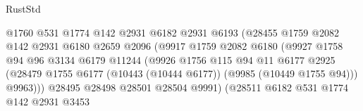 \begin{lexlean}{RustStd}
\begin{coremodule}
                                        @1760
                                        @531
                                        @1774
                                        @142
                                        @2931
                                        @6182
                                        @2931
                                        @6193
                                        (@28455
                                          @1759
                                          @2082
                                          @142
                                          @2931
                                          @6180
                                          @2659
                                          @2096
                                          (@9917
                                            @1759
                                            @2082
                                            @6180
                                            (@9927
                                              @1758
                                              @94
                                              @96
                                              @3134
                                              @6179
                                              @11244
                                              (@9926
                                                @1756
                                                @115
                                                @94
                                                @11
                                                @6177
                                                @2925
                                                (@28479
                                                  @1755
                                                  @6177
                                                  (@10443 (@10444 @6177))
                                                  (@9985 (@10449 @1755 @94)))
                                                @9963)))
                                          @28495
                                          @28498
                                          @28501
                                          @28504
                                          @9991)
                                        (@28511
                                          @6182
                                          @531
                                          @1774
                                          @142
                                          @2931
                                          @3453

\end{coremodule}
\end{lexlean}
